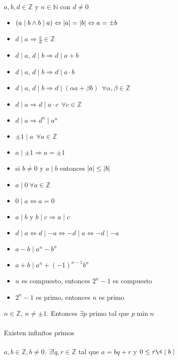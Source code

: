 \documentclass[a4paper,10pt]{article}
\begin{document}
 \\
$a,b,d \in \mathbb{Z}$ y $n \in \mathbb{N}$ con $d \neq 0$
\begin{itemize}
  \item $( a \mid b \wedge b \mid a) \Leftrightarrow \left\lvert a\right\rvert = \left\lvert b\right\rvert \Leftrightarrow a = \pm b$
  \item $d \mid a \Rightarrow \frac{a}{d} \in \mathbb{Z}$ 
  \item $d \mid a$, $d \mid b \Rightarrow d \mid a + b$
  \item $d \mid a$, $d \mid b \Rightarrow d \mid a \cdot b$
  \item $d \mid a$, $d \mid b \Rightarrow d \mid (\alpha a + \beta b) \ \ \forall \alpha,\beta \in \mathbb{Z}$
  \item $d \mid a \Rightarrow d \mid a \cdot c \ \ \forall c \in \mathbb{Z}$
  \item $d \mid a \Rightarrow d^n \mid a^n$
  \item $\pm 1 \mid a \ \ \forall a \in \mathbb{Z}$
  \item $a \mid \pm 1 \Rightarrow a = \pm 1$
  \item si $b \neq 0$ y $a \mid b$ entonces $\left\lvert a\right\rvert \leq \left\lvert b\right\rvert$
  \item $a \mid 0 \ \forall a \in \mathbb{Z}$
  \item $0 \mid a \Leftrightarrow a = 0$
  \item $a \mid b$ y $b \mid c \Rightarrow a \mid c$
  \item $d \mid a \Leftrightarrow d \mid -a \Leftrightarrow -d \mid a \Leftrightarrow -d \mid -a$
  \item $a - b \mid a^n - b^n$
  \item $a + b \mid a^n + (-1)^{n-1}b^n$
  \item $n$ es compuesto, entonces $2^{n}-1$ es compuesto
  \item $2^{n}-1$ es primo, entonces $n$ es primo
\end{itemize}

\teorema $n \in \mathbb{Z}$, $n \not = \pm 1$. Entonces $\exists p$ primo tal que $p \min n$ \\ \\

\teorema Existen infinitos primos \\ \\

 $a,b \in \mathbb{Z}, b \not = 0$. $\exists! q,r \in \mathbb{Z}$ tal que $a = bq + r$ y $0 \leq r \< \mid b \mid$ 
\end{document}
